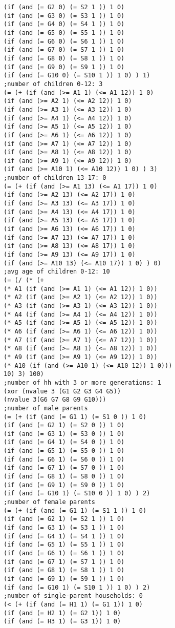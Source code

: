 \documentclass[5p,times,11pt]{elsarticle}
\begin{document}
\begin{verbatim}
(if (and (= G2 0) (= S2 1 )) 1 0)
(if (and (= G3 0) (= S3 1 )) 1 0)
(if (and (= G4 0) (= S4 1 )) 1 0)
(if (and (= G5 0) (= S5 1 )) 1 0)
(if (and (= G6 0) (= S6 1 )) 1 0)
(if (and (= G7 0) (= S7 1 )) 1 0)
(if (and (= G8 0) (= S8 1 )) 1 0)
(if (and (= G9 0) (= S9 1 )) 1 0)
(if (and (= G10 0) (= S10 1 )) 1 0) ) 1)
;number of children 0-12: 3
(= (+ (if (and (>= A1 1) (<= A1 12)) 1 0)
(if (and (>= A2 1) (<= A2 12)) 1 0)
(if (and (>= A3 1) (<= A3 12)) 1 0)
(if (and (>= A4 1) (<= A4 12)) 1 0)
(if (and (>= A5 1) (<= A5 12)) 1 0)
(if (and (>= A6 1) (<= A6 12)) 1 0)
(if (and (>= A7 1) (<= A7 12)) 1 0)
(if (and (>= A8 1) (<= A8 12)) 1 0)
(if (and (>= A9 1) (<= A9 12)) 1 0)
(if (and (>= A10 1) (<= A10 12)) 1 0) ) 3)
;number of children 13-17: 0
(= (+ (if (and (>= A1 13) (<= A1 17)) 1 0)
(if (and (>= A2 13) (<= A2 17)) 1 0)
(if (and (>= A3 13) (<= A3 17)) 1 0)
(if (and (>= A4 13) (<= A4 17)) 1 0)
(if (and (>= A5 13) (<= A5 17)) 1 0)
(if (and (>= A6 13) (<= A6 17)) 1 0)
(if (and (>= A7 13) (<= A7 17)) 1 0)
(if (and (>= A8 13) (<= A8 17)) 1 0)
(if (and (>= A9 13) (<= A9 17)) 1 0)
(if (and (>= A10 13) (<= A10 17)) 1 0) ) 0)
;avg age of children 0-12: 10
(= (/ (* (+
(* A1 (if (and (>= A1 1) (<= A1 12)) 1 0))
(* A2 (if (and (>= A2 1) (<= A2 12)) 1 0))
(* A3 (if (and (>= A3 1) (<= A3 12)) 1 0))
(* A4 (if (and (>= A4 1) (<= A4 12)) 1 0))
(* A5 (if (and (>= A5 1) (<= A5 12)) 1 0))
(* A6 (if (and (>= A6 1) (<= A6 12)) 1 0))
(* A7 (if (and (>= A7 1) (<= A7 12)) 1 0))
(* A8 (if (and (>= A8 1) (<= A8 12)) 1 0))
(* A9 (if (and (>= A9 1) (<= A9 12)) 1 0))
(* A10 (if (and (>= A10 1) (<= A10 12)) 1 0)))
10) 3) 100)
;number of hh with 3 or more generations: 1
(xor (nvalue 3 (G1 G2 G3 G4 G5))
(nvalue 3(G6 G7 G8 G9 G10)))
;number of male parents
(= (+ (if (and (= G1 1) (= S1 0 )) 1 0)
(if (and (= G2 1) (= S2 0 )) 1 0)
(if (and (= G3 1) (= S3 0 )) 1 0)
(if (and (= G4 1) (= S4 0 )) 1 0)
(if (and (= G5 1) (= S5 0 )) 1 0)
(if (and (= G6 1) (= S6 0 )) 1 0)
(if (and (= G7 1) (= S7 0 )) 1 0)
(if (and (= G8 1) (= S8 0 )) 1 0)
(if (and (= G9 1) (= S9 0 )) 1 0)
(if (and (= G10 1) (= S10 0 )) 1 0) ) 2)
;number of female parents
(= (+ (if (and (= G1 1) (= S1 1 )) 1 0)
(if (and (= G2 1) (= S2 1 )) 1 0)
(if (and (= G3 1) (= S3 1 )) 1 0)
(if (and (= G4 1) (= S4 1 )) 1 0)
(if (and (= G5 1) (= S5 1 )) 1 0)
(if (and (= G6 1) (= S6 1 )) 1 0)
(if (and (= G7 1) (= S7 1 )) 1 0)
(if (and (= G8 1) (= S8 1 )) 1 0)
(if (and (= G9 1) (= S9 1 )) 1 0)
(if (and (= G10 1) (= S10 1 )) 1 0) ) 2)
;number of single-parent households: 0
(< (+ (if (and (= H1 1) (= G1 1)) 1 0)
(if (and (= H2 1) (= G2 1)) 1 0)
(if (and (= H3 1) (= G3 1)) 1 0)

\end{verbatim}
\end{document}
